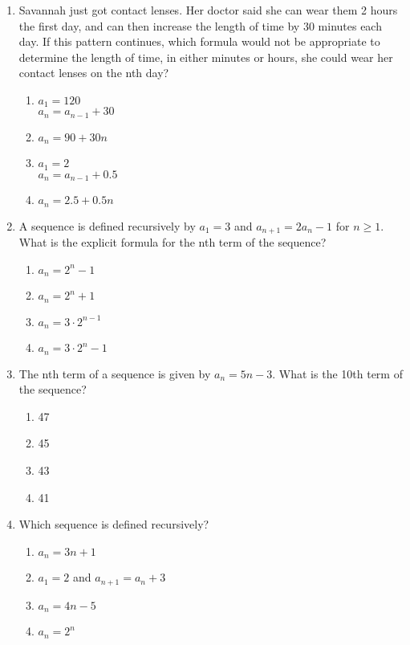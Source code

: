 \documentclass[12pt, twoside]{article}
\begin{document}
\begin{enumerate}[itemsep=0.5cm]
\item Savannah just got contact lenses. Her doctor said she can wear them 2 hours the first day, and can then increase the length of time by 30 minutes each day. If this pattern continues, which formula would not be appropriate to determine the length of time, in either minutes or hours, she could wear her contact lenses on the nth day?
\begin{multicols}{2}
\begin{enumerate}
    \item $a_1 = 120$ \\
    $a_n = a_{n-1} + 30$
    \item $a_n = 90 + 30n$
    \item $a_1 = 2$ \\
    $a_n = a_{n-1} + 0.5$
    \item $a_n = 2.5 + 0.5n$
\end{enumerate}
\end{multicols}

\item A sequence is defined recursively by $a_1 = 3$ and $a_{n+1} = 2a_n - 1$ for $n \geq 1$. What is the explicit formula for the nth term of the sequence?
\begin{enumerate}
    \item $a_n = 2^n - 1$
    \item $a_n = 2^n + 1$
    \item $a_n = 3 \cdot 2^{n-1}$
    \item $a_n = 3 \cdot 2^n - 1$
\end{enumerate}

\item The nth term of a sequence is given by $a_n = 5n - 3$. What is the 10th term of the sequence?
\begin{enumerate}
    \item 47
    \item 45
    \item 43
    \item 41
\end{enumerate}

\item Which sequence is defined recursively?
\begin{enumerate}
    \item $a_n = 3n + 1$
    \item $a_1 = 2$ and $a_{n+1} = a_n + 3$
    \item $a_n = 4n - 5$
    \item $a_n = 2^n$
\end{enumerate}


\end{enumerate}
\end{document}
